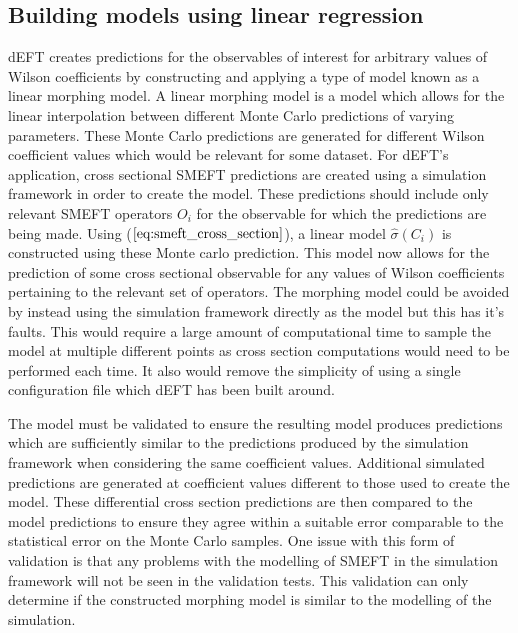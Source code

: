 \documentclass[a4paper,11pt]{article}
\begin{document}
\subsection{Building models using linear regression}
dEFT creates predictions for the observables of interest for arbitrary values of Wilson coefficients by constructing and applying a type of model known as a linear morphing model.
A linear morphing model is a model which allows for the linear interpolation between different Monte Carlo predictions of varying parameters.
These Monte Carlo predictions are generated for different Wilson coefficient values which would be relevant for some dataset.
For dEFT's application, cross sectional SMEFT predictions are created using a simulation framework in order to create the model.
These predictions should include only relevant SMEFT operators $O_{i}$ for the observable for which the predictions are being made.
Using ($\ref{eq:smeft_cross_section}$), a linear model $\hat{\sigma}({C_i})$ is constructed using these Monte carlo prediction.
This model now allows for the prediction of some cross sectional observable for any values of Wilson coefficients pertaining to the relevant set of operators.
The morphing model could be avoided by instead using the simulation framework directly as the model but this has it's faults.
This would require a large amount of computational time to sample the model at multiple different points as cross section computations would need to be performed each time.
It also would remove the simplicity of using a single configuration file which dEFT has been built around.

The model must be validated to ensure the resulting model produces predictions which are sufficiently similar to the predictions produced by the simulation framework when considering the same coefficient values.
Additional simulated predictions are generated at coefficient values different to those used to create the model.
These differential cross section predictions are then compared to the model predictions to ensure they agree within a suitable error comparable to the statistical error on the Monte Carlo samples.
One issue with this form of validation is that any problems with the modelling of SMEFT in the simulation framework will not be seen in the validation tests.
This validation can only determine if the constructed morphing model is similar to the modelling of the simulation.
\end{document}
